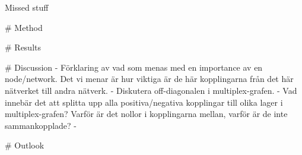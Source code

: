 Missed stuff

# Method


# Results

# Discussion 
    - Förklaring av vad som menas med en importance av en node/network. Det vi menar är hur viktiga är de här kopplingarna från det här nätverket till andra nätverk.
    - Diskutera off-diagonalen i multiplex-grafen.
    - Vad innebär det att splitta upp alla positiva/negativa kopplingar till olika lager i multiplex-grafen? Varför är det nollor i kopplingarna mellan, varför är de inte sammankopplade?
    - 

# Outlook